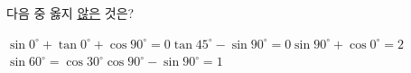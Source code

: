다음 중 옳지 \underline{않은} 것은?
\begin{choicesv}{$\sin 0^\circ+\tan 0^\circ+\cos 90^\circ=0$}{$\tan 45^\circ-\sin 90^\circ=0$}{$\sin 90^\circ+\cos 0^\circ=2$}{$\sin 60^\circ=\cos 30^\circ$}{$\cos 90^\circ-\sin 90^\circ=1$}\end{choicesv}

